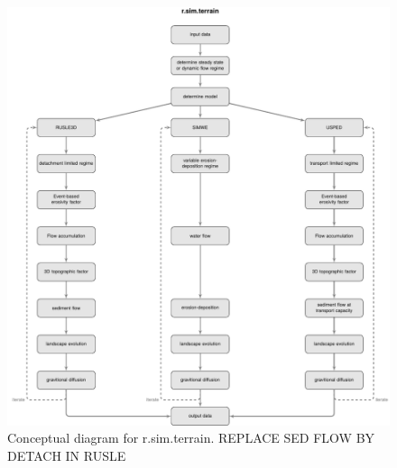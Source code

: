 \documentclass[gmd, manuscript]{copernicus}
\begin{document}

\begin{figure}%
\center
\includegraphics[width=\textwidth,keepaspectratio]{figures/concept.pdf}
\caption{Conceptual diagram for r.sim.terrain. REPLACE SED FLOW BY DETACH IN RUSLE}
\label{fig:evolution}
\end{figure}

\end{document}
